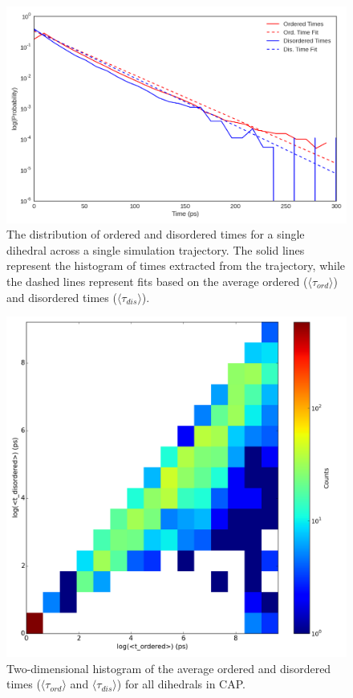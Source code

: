\documentclass[../main.tex]{subfiles}
\begin{document}
    \begin{figure}[!htb] %
        \centering
        \includegraphics[width=4.5in]{suppfig2-timescale-dists.png}
        \caption[Distribution of ordered and disordered times for a single dihedral across a single simulation trajectory.]{The distribution of ordered and disordered times for a single dihedral across a single simulation trajectory. The solid lines represent the histogram of times extracted from the trajectory, while the dashed lines represent fits based on the average ordered ($\langle\tau_{ord}\rangle$) and disordered times ($\langle\tau_{dis}\rangle$).}
        \label{fig:cards-timescale-dists-fig}
    \end{figure} 

    \begin{figure}[!htb] %
        \centering
        \includegraphics[width=4.5in]{suppfig3-avgtimes-2dhist.png}
        \caption[The average ordered and disordered times for CAP]{Two-dimensional histogram of the average ordered and disordered times ($\langle\tau_{ord}\rangle$ and $\langle\tau_{dis}\rangle$) for all dihedrals in CAP.}
        \label{fig:cards-avgtimes-2dhist-fig}
    \end{figure} 
\end{document}
